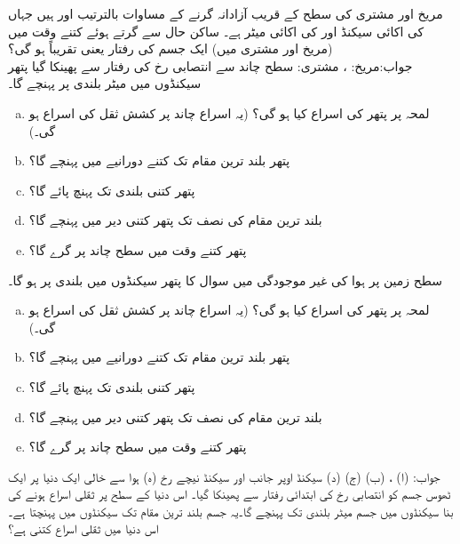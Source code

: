 مریخ اور مشتری کی سطح کے قریب آزادانہ گرنے کے مساوات بالترتیب  اور  ہیں جہاں  کی اکائی سیکنڈ اور  کی اکائی میٹر ہے۔ ساکن حال سے گرتے ہوئے کتنے وقت میں (مریخ اور مشتری میں) ایک جسم کی رفتار  یعنی تقریباً  ہو گی؟\\
جواب:\quad مریخ: ، مشتری: 
سطح چاند سے  انتصابی رخ  کی رفتار سے  پھینکا گیا پتھر  سیکنڈوں میں  میٹر بلندی پر پہنچے گا۔
\begin{enumerate}[a.]

\item
لمحہ  پر پتھر کی اسراع کیا ہو گی؟ (یہ اسراع چاند پر کشش ثقل کی اسراع ہو گی۔)
\item
پتھر بلند ترین مقام تک کتنے دورانیے میں پہنچے گا؟
\item
پتھر کتنی بلندی تک پہنچ پائے گا؟
\item
بلند ترین مقام کی نصف تک پتھر کتنی دیر میں پہنچے گا؟
\item
پتھر  کتنے وقت میں سطح چاند پر گرے گا؟ 
\end{enumerate}   
سطح زمین پر ہوا کی  غیر موجودگی میں سوال  کا پتھر  سیکنڈوں میں  بلندی پر ہو گا۔
\begin{enumerate}[a.]

\item
لمحہ  پر پتھر کی اسراع کیا ہو گی؟ (یہ اسراع چاند پر کشش ثقل کی اسراع ہو گی۔)
\item
پتھر بلند ترین مقام تک کتنے دورانیے میں پہنچے گا؟
\item
پتھر کتنی بلندی تک پہنچ پائے گا؟
\item
بلند ترین مقام کی نصف تک پتھر کتنی دیر میں پہنچے گا؟
\item
پتھر  کتنے وقت میں سطح چاند پر گرے گا؟ 
\end{enumerate}   
جواب:\quad
(ا) ،  (ب)  (ج)  (د)  سیکنڈ اوپر جانب اور  سیکنڈ نیچے رخ (ہ)  
ہوا سے خالی ایک دنیا پر ایک ٹھوس جسم کو انتصابی رخ  کی ابتدائی رفتار سے پھینکا گیا۔ اس دنیا کے سطح پر ثقلی اسراع   ہونے کی بنا  سیکنڈوں میں جسم   میٹر بلندی تک پہنچے گا۔یہ جسم بلند ترین مقام تک  سیکنڈوں میں پہنچتا ہے۔ اس دنیا میں ثقلی اسراع کتنی ہے؟
